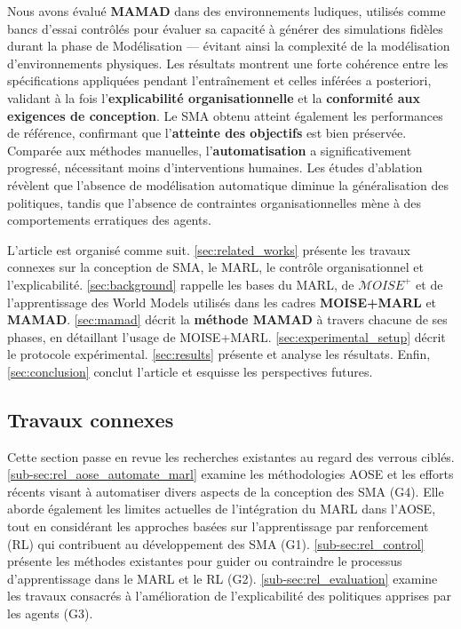 Nous avons évalué \textbf{MAMAD} dans des environnements ludiques, utilisés comme bancs d'essai contrôlés pour évaluer sa capacité à générer des simulations fidèles durant la phase de Modélisation — évitant ainsi la complexité de la modélisation d'environnements physiques. Les résultats montrent une forte cohérence entre les spécifications appliquées pendant l'entraînement et celles inférées a posteriori, validant à la fois l'\textbf{explicabilité organisationnelle} et la \textbf{conformité aux exigences de conception}. Le SMA obtenu atteint également les performances de référence, confirmant que l'\textbf{atteinte des objectifs} est bien préservée. Comparée aux méthodes manuelles, l'\textbf{automatisation} a significativement progressé, nécessitant moins d'interventions humaines. Les études d'ablation révèlent que l'absence de modélisation automatique diminue la généralisation des politiques, tandis que l'absence de contraintes organisationnelles mène à des comportements erratiques des agents.

\vspace{0.5em}

L'article est organisé comme suit. \autoref{sec:related_works} présente les travaux connexes sur la conception de SMA, le MARL, le contrôle organisationnel et l'explicabilité. \autoref{sec:background} rappelle les bases du MARL, de $\mathcal{M}OISE^+$ et de l'apprentissage des World Models utilisés dans les cadres \textbf{MOISE+MARL} et \textbf{MAMAD}. \autoref{sec:mamad} décrit la \textbf{méthode MAMAD} à travers chacune de ses phases, en détaillant l'usage de MOISE+MARL. \autoref{sec:experimental_setup} décrit le protocole expérimental. \autoref{sec:results} présente et analyse les résultats. Enfin, \autoref{sec:conclusion} conclut l'article et esquisse les perspectives futures.


\subsection{Travaux connexes}\label{sec:related_works}

Cette section passe en revue les recherches existantes au regard des verrous ciblés. \autoref{sub-sec:rel_aose_automate_marl} examine les méthodologies AOSE et les efforts récents visant à automatiser divers aspects de la conception des SMA (G4). Elle aborde également les limites actuelles de l'intégration du MARL dans l'AOSE, tout en considérant les approches basées sur l'apprentissage par renforcement (RL) qui contribuent au développement des SMA (G1). \autoref{sub-sec:rel_control} présente les méthodes existantes pour guider ou contraindre le processus d'apprentissage dans le MARL et le RL (G2).
\autoref{sub-sec:rel_evaluation} examine les travaux consacrés à l'amélioration de l'explicabilité des politiques apprises par les agents (G3).

